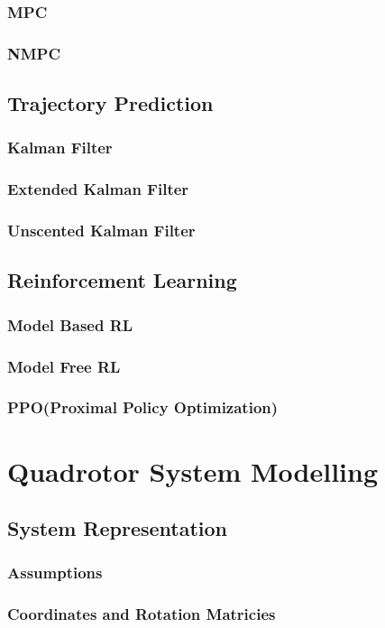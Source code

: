 \documentclass{UoNMCHA}
\numberwithin{equation}{section}
\begin{document}
\subsubsection{MPC}
\subsubsection{NMPC}
\subsection{Trajectory Prediction}
\subsubsection{Kalman Filter}
\subsubsection{Extended Kalman Filter}
\subsubsection{Unscented Kalman Filter}
\subsection{Reinforcement Learning}
\subsubsection{Model Based RL}
\subsubsection{Model Free RL}
\subsubsection{PPO(Proximal Policy Optimization)}


\section{Quadrotor System Modelling}
\subsection{System Representation}
\subsubsection{Assumptions}
\subsubsection{Coordinates and Rotation Matricies}
\end{document}
